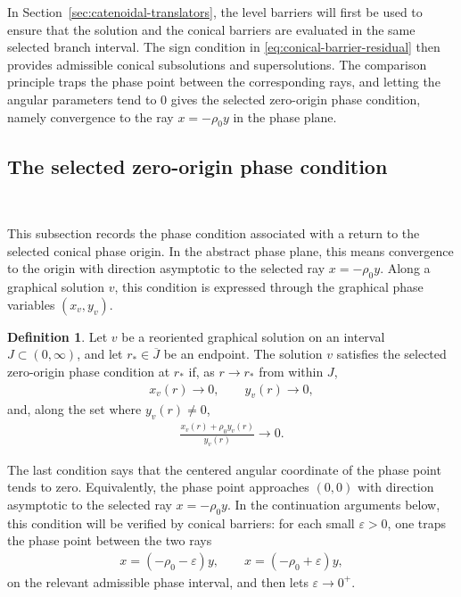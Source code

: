 \documentclass{amsart}
\theoremstyle{plain}
\theoremstyle{mainintrothm}
\theoremstyle{definition}
\newtheorem{definition}[theorem]{Definition}
\begin{document}
	\medskip
	
	In Section~\ref{sec:catenoidal-translators}, the level barriers will first be
	used to ensure that the solution and the conical barriers are evaluated in the
	same selected branch interval.  The sign condition in
	\eqref{eq:conical-barrier-residual} then provides admissible conical
	subsolutions and supersolutions.  The comparison principle traps the phase
	point between the corresponding rays, and letting the angular parameters tend
	to $0$ gives the selected zero-origin phase condition, namely convergence to
	the ray $x=-\rho_0y$ in the phase plane.
	
	
\subsection{The selected zero-origin phase condition}\,
\label{subsec:zero-origin-phase}

This subsection records the phase condition associated with a return to the selected
conical phase origin.  In the abstract phase plane, this means convergence to
the origin with direction asymptotic to the selected ray $x=-\rho_0y$.  Along a
graphical solution $v$, this condition is expressed through the graphical phase
variables $(x_v,y_v)$.

\begin{definition}
	\label{def:zero-origin-return}
	Let $v$ be a reoriented graphical solution on an interval
	$J\subset(0,\infty)$, and let $r_*\in\overline J$ be an endpoint.  The
	solution $v$ satisfies the selected zero-origin phase condition at $r_*$ if, as
	$r\to r_*$ from within $J$,
	\begin{align*}
		x_v(r)\to0,
		\qquad
		y_v(r)\to0,
	\end{align*}
	and, along the set where $y_v(r)\ne0$,
	\begin{align*}
		\frac{x_v(r)+\rho_0y_v(r)}
		{y_v(r)}
		\to0.
	\end{align*}
\end{definition}

The last condition says that the centered angular coordinate of the phase point
tends to zero.  Equivalently, the phase point approaches $(0,0)$ with direction
asymptotic to the selected ray $x=-\rho_0y$.  In the continuation arguments
below, this condition will be verified by conical barriers: for each small
$\varepsilon>0$, one traps the phase point between the two rays
\begin{align*}
	x=(-\rho_0-\varepsilon)y,
	\qquad
	x=(-\rho_0+\varepsilon)y,
\end{align*}
on the relevant admissible phase interval, and then lets
$\varepsilon\to0^+$.
\end{document}
